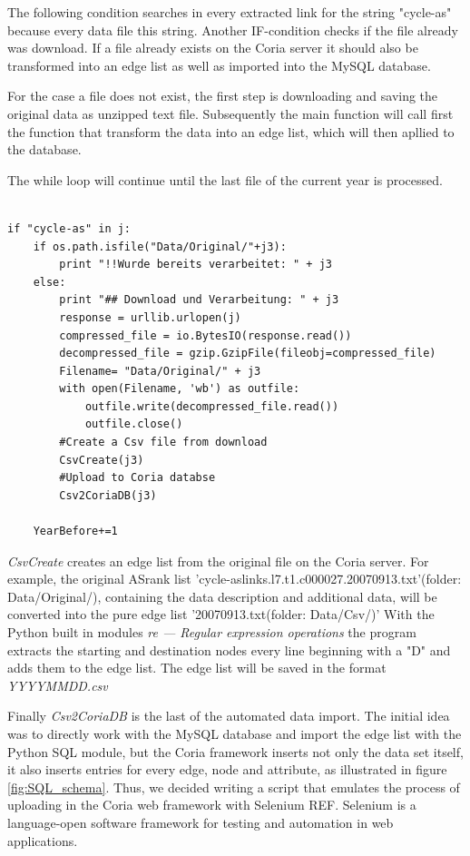 \documentclass[conference, 11pt]{IEEEtran}
\begin{document}
The following condition searches in every extracted link for the string "cycle-as" because every data file this string.
Another IF-condition checks if the file already was download. If a file already exists on the Coria server it should also be transformed into an edge list as well as imported into the MySQL database.

For the case a file does not exist, the first step is downloading and saving the original data as unzipped text file. 
Subsequently the main function will call first the function that transform the data into an edge list, which will then apllied to the database.

The while loop will continue until the last file of the current year is processed.
\linebreak


\begin{lstlisting}[float=*,caption={A wide listing float, single column}]

if "cycle-as" in j:
	if os.path.isfile("Data/Original/"+j3):
		print "!!Wurde bereits verarbeitet: " + j3
	else:
		print "## Download und Verarbeitung: " + j3
		response = urllib.urlopen(j)
		compressed_file = io.BytesIO(response.read())
		decompressed_file = gzip.GzipFile(fileobj=compressed_file)
		Filename= "Data/Original/" + j3
		with open(Filename, 'wb') as outfile:
			outfile.write(decompressed_file.read())
			outfile.close()
		#Create a Csv file from download 
		CsvCreate(j3)
		#Upload to Coria databse 
		Csv2CoriaDB(j3)

	YearBefore+=1 

\end{lstlisting}


\textit{CsvCreate} creates an edge list from the original file on the Coria server.
For example, the original ASrank list 'cycle-aslinks.l7.t1.c000027.20070913.txt'(folder: Data/Original/), containing the data description and additional data, will be converted into the pure edge list '20070913.txt(folder: Data/Csv/)'
With the Python built in modules \textit{re — Regular expression operations} the program extracts the starting and destination nodes every line beginning with a "D" and adds them to the edge list. 
The edge list will be saved in the format \textit{YYYYMMDD.csv}
\linebreak

Finally \textit{Csv2CoriaDB} is the last  of the automated data import.
The initial idea was to directly work with the MySQL database and import the edge list with the Python SQL module, but the Coria framework inserts not only the data set itself, it also inserts entries for every edge, node and attribute, as illustrated in figure \ref{fig:SQL_schema}.
Thus, we decided writing a script that emulates the process of uploading in the Coria web framework with Selenium REF. Selenium is a language-open software framework for testing and automation in web applications. \break
\end{document}
